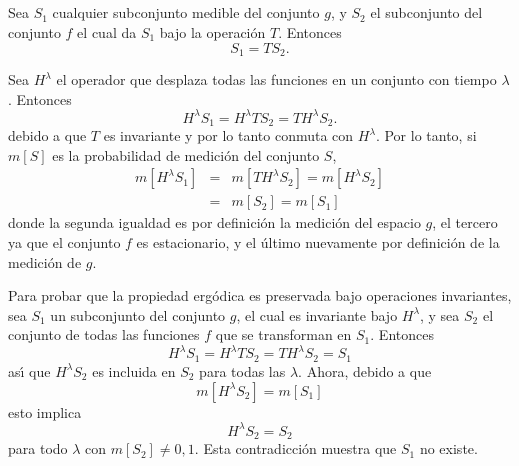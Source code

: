 \begin{appendices}

\chapter{}

Sea $S_{1}$ cualquier subconjunto medible del conjunto $g$, y $S_{2}$
el subconjunto del conjunto $f$ el cual da $S_{1}$ bajo la operaci\'on
$T$. Entonces
\begin{equation} S_{1} = TS_{2}.\end{equation}

Sea $H^{\lambda}$ el operador que desplaza todas las funciones en un
conjunto con tiempo $\lambda$. Entonces
\begin{equation} 
H^{\lambda} S_{1} = H^{\lambda} T S_{2} = T H^{\lambda} S_{2}. 
\end{equation}
debido a que $T$ es invariante y por lo tanto conmuta con
$H^{\lambda}$. Por lo tanto, si $m[S]$ es la probabilidad de
medici\'on del conjunto $S$,
\begin{equation} 
\begin{array}{rcl}
m[H^{\lambda} S_{1}] &=& m[T H^{\lambda} S_{2}] = m[H^{\lambda} S_{2}] \\
&=& m[S_{2}] = m[S_{1}]
\end{array}
\end{equation}
donde la segunda igualdad es por definici\'on la medici\'on del
espacio $g$, el tercero ya que el conjunto $f$ es estacionario, y el
\'ultimo nuevamente por definici\'on de la medici\'on de $g$.

Para probar que la propiedad ergódica es preservada bajo operaciones
invariantes, sea $S_{1}$ un subconjunto del conjunto $g$, el cual es
invariante bajo $H^{\lambda}$, y sea $S_{2}$ el conjunto de todas las
funciones $f$ que se transforman en $S_{1}$. Entonces
\begin{equation} H^{\lambda} S_{1} = H^{\lambda} T S_{2} = T H^{\lambda} S_{2} = S_{1} \end{equation}
as\'{\i} que $H^{\lambda} S_{2}$ es incluida en $S_{2}$ para todas las
$\lambda$. Ahora, debido a que
\begin{equation} m[H^{\lambda} S_{2}] = m[S_{1}] \end{equation}
esto implica
\begin{equation} H^{\lambda} S_{2} = S_{2} \end{equation}
para todo $\lambda$ con $m[S_{2}] \neq 0, 1$. Esta contradicci\'on muestra que $S_{1}$ no existe.


\end{appendices}
